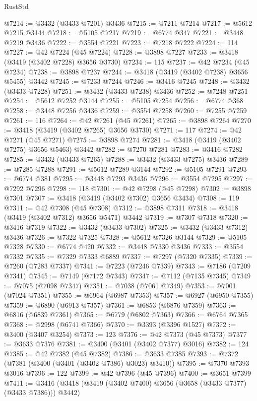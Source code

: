 \begin{lexlean}{RustStd}
\begin{coremodule}
@7214 := @3432 (@3433 @7201) @3436
@7215 := @7211 @7214
@7217 := @5612 @7215 @3144
@7218 := @5105 @7217
@7219 := @6774 @347
@7221 := @3448 @7219 @3436
@7222 := @3554 @7221
@7223 := @7218 @7222
@7224 := 114
@7227 := @42 @7224 (@45 @7224)
@7228 := @3898 @7227
@7233 := @3418 (@3419 (@3402 @7228) @3656 @3730)
@7234 := 115
@7237 := @42 @7234 (@45 @7234)
@7238 := @3898 @7237
@7244 := @3418 (@3419 (@3402 @7238) @3656 @5455) @3442
@7245 := @7233 @7244
@7246 := @3416 @7245
@7248 := @3432 (@3433 @7228)
@7251 := @3432 (@3433 @7238) @3436
@7252 := @7248 @7251
@7254 := @5612 @7252 @3144
@7255 := @5105 @7254
@7256 := @6774 @368
@7258 := @3448 @7256 @3436
@7259 := @3554 @7258
@7260 := @7255 @7259
@7261 := 116
@7264 := @42 @7261 (@45 @7261)
@7265 := @3898 @7264
@7270 := @3418 (@3419 (@3402 @7265) @3656 @3730)
@7271 := 117
@7274 := @42 @7271 (@45 @7271)
@7275 := @3898 @7274
@7281 := @3418 (@3419 (@3402 @7275) @3656 @5463) @3442
@7282 := @7270 @7281
@7283 := @3416 @7282
@7285 := @3432 (@3433 @7265)
@7288 := @3432 (@3433 @7275) @3436
@7289 := @7285 @7288
@7291 := @5612 @7289 @3144
@7292 := @5105 @7291
@7293 := @6774 @381
@7295 := @3448 @7293 @3436
@7296 := @3554 @7295
@7297 := @7292 @7296
@7298 := 118
@7301 := @42 @7298 (@45 @7298)
@7302 := @3898 @7301
@7307 := @3418 (@3419 (@3402 @7302) @3656 @3434)
@7308 := 119
@7311 := @42 @7308 (@45 @7308)
@7312 := @3898 @7311
@7318 := @3418 (@3419 (@3402 @7312) @3656 @5471) @3442
@7319 := @7307 @7318
@7320 := @3416 @7319
@7322 := @3432 (@3433 @7302)
@7325 := @3432 (@3433 @7312) @3436
@7326 := @7322 @7325
@7328 := @5612 @7326 @3144
@7329 := @5105 @7328
@7330 := @6774 @420
@7332 := @3448 @7330 @3436
@7333 := @3554 @7332
@7335 := @7329 @7333 @6889
@7337 := @7297 (@7320 @7335)
@7339 := @7260 (@7283 @7337)
@7341 := @7223 (@7246 @7339)
@7343 := @7186 (@7209 @7341)
@7345 := @7149 (@7172 @7343)
@7347 := @7112 (@7135 @7345)
@7349 := @7075 (@7098 @7347)
@7351 := @7038 (@7061 @7349)
@7353 := @7001 (@7024 @7351)
@7355 := @6964 (@6987 @7353)
@7357 := @6927 (@6950 @7355)
@7359 := @6890 (@6913 @7357)
@7361 := @6853 (@6876 @7359)
@7363 := @6816 (@6839 @7361)
@7365 := @6779 (@6802 @7363)
@7366 := @6764 @7365
@7368 := @2998 (@6741 @7366)
@7370 := @3393 (@3396 @1527)
@7372 := @3400 (@3407 @3254)
@7373 := 123
@7376 := @42 @7373 (@45 @7373)
@7377 := @3633 @7376
@7381 := @3400 (@3401 (@3402 @7377) @3016)
@7382 := 124
@7385 := @42 @7382 (@45 @7382)
@7386 := @3633 @7385
@7393 := @7372 (@7381 (@3400 (@3401 (@3402 @7386) @3023) @3410))
@7395 := @7370 @7393 @3016
@7396 := 122
@7399 := @42 @7396 (@45 @7396)
@7400 := @3651 @7399
@7411 := @3416 (@3418 (@3419 (@3402 @7400) @3656 (@3658 (@3433 @7377) (@3433 @7386))) @3442)

\end{coremodule}
\end{lexlean}
